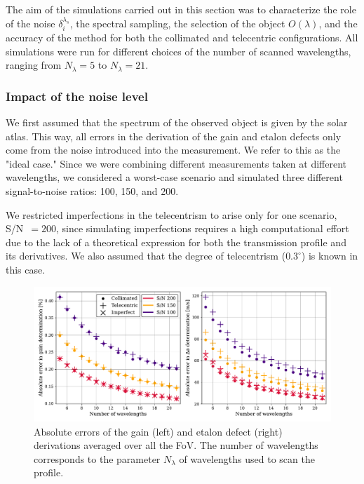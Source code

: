 The aim of the simulations carried out in this section was to characterize the role of the noise $\delta _ i ^ {\lambda_s}$, the spectral sampling, the selection of the object $O(\lambda)$, and the accuracy of the method for both the collimated and telecentric configurations. All simulations were run for different choices of the number of scanned wavelengths, ranging from $N_\lambda=5$ to $N_\lambda=21$. 

\subsubsection{Impact of the noise level}
We first assumed that the spectrum of the observed object is given by the solar atlas. This way, all errors in the derivation of the gain and etalon defects only come from the noise introduced into the measurement. We refer to this as the "ideal case." Since we were combining different measurements taken at different wavelengths, we considered a worst-case scenario and simulated three different signal-to-noise ratios: 100, 150, and 200. 

We restricted imperfections in the telecentrism to arise only for one scenario, S/N~$=200$, since simulating imperfections requires a high computational effort due to the lack of a theoretical expression for both the transmission profile and its derivatives. We also assumed that the degree of telecentrism ($0.3 ^\circ $) is known in this case.

\begin{figure}
    \centering
     \includegraphics[width=\textwidth]{figures/EtalonPaper/SNR_plot_imperfect.pdf}
    \caption{Absolute errors of the gain (left) and etalon defect (right) derivations averaged over all the FoV. The number of wavelengths corresponds to the parameter $N_\lambda$ of wavelengths used to scan the profile.\label{fig_etalon_corr:SNR_both}}
\end{figure}

